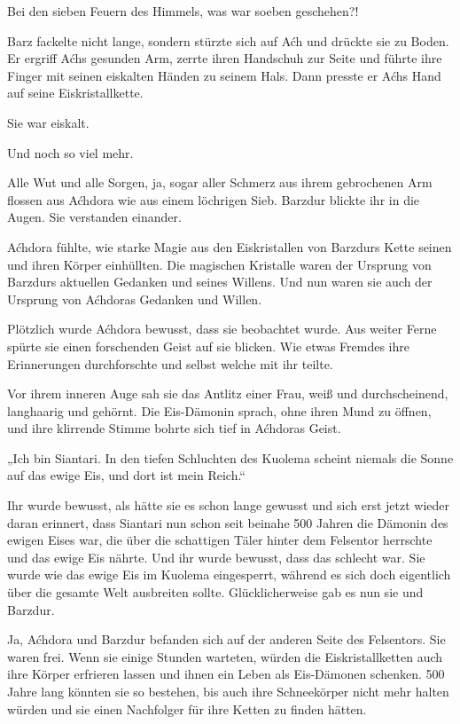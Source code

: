 Bei den sieben Feuern des Himmels, was war soeben geschehen?!

Barz fackelte nicht lange, sondern stürzte sich auf Aćh und drückte sie zu Boden. Er ergriff Aćhs gesunden Arm, zerrte ihren Handschuh zur Seite und führte ihre Finger mit seinen eiskalten Händen zu seinem Hals. Dann presste er Aćhs Hand auf seine Eiskristallkette.

Sie war eiskalt.

Und noch so viel mehr.



\trennzeichen



Alle Wut und alle Sorgen, ja, sogar aller Schmerz aus ihrem gebrochenen Arm flossen aus Aćhdora wie aus einem löchrigen Sieb. Barzdur blickte ihr in die Augen. Sie verstanden einander.

Aćhdora fühlte, wie starke Magie aus den Eiskristallen von Barzdurs Kette seinen und ihren Körper einhüllten. Die magischen Kristalle waren der Ursprung von Barzdurs aktuellen Gedanken und seines Willens. Und nun waren sie auch der Ursprung von Aćhdoras Gedanken und Willen.

Plötzlich wurde Aćhdora bewusst, dass sie beobachtet wurde. Aus weiter Ferne spürte sie einen forschenden Geist auf sie blicken. Wie etwas Fremdes ihre Erinnerungen durchforschte und selbst welche mit ihr teilte.

Vor ihrem inneren Auge sah sie das Antlitz einer Frau, weiß und durchscheinend, langhaarig und gehörnt. Die Eis-Dämonin sprach, ohne ihren Mund zu öffnen, und ihre klirrende Stimme bohrte sich tief in Aćhdoras Geist.

„Ich bin Siantari. In den tiefen Schluchten des Kuolema scheint niemals die Sonne auf das ewige Eis, und dort ist mein Reich.“

Ihr wurde bewusst, als hätte sie es schon lange gewusst und sich erst jetzt wieder daran erinnert, dass Siantari nun schon seit beinahe 500 Jahren die Dämonin des ewigen Eises war, die über die schattigen Täler hinter dem Felsentor herrschte und das ewige Eis nährte. Und ihr wurde bewusst, dass das schlecht war. Sie wurde wie das ewige Eis im Kuolema eingesperrt, während es sich doch eigentlich über die gesamte Welt ausbreiten sollte. Glücklicherweise gab es nun sie und Barzdur.

Ja, Aćhdora und Barzdur befanden sich auf der anderen Seite des Felsentors. Sie waren frei. Wenn sie einige Stunden warteten, würden die Eiskristallketten auch ihre Körper erfrieren lassen und ihnen ein Leben als Eis-Dämonen schenken. 500 Jahre lang könnten sie so bestehen, bis auch ihre Schneekörper nicht mehr halten würden und sie einen Nachfolger für ihre Ketten zu finden hätten.

